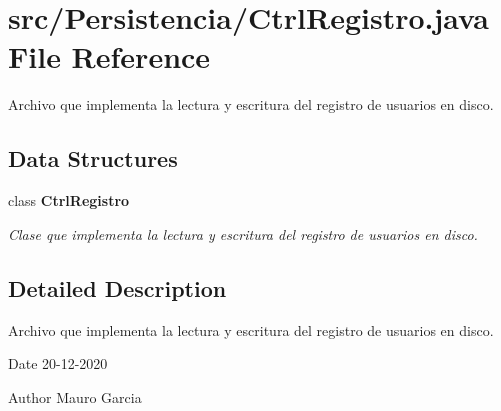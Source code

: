 \section{src/\+Persistencia/\+Ctrl\+Registro.java File Reference}
\label{_ctrl_registro_8java}


Archivo que implementa la lectura y escritura del registro de usuarios en disco.  


\subsection*{Data Structures}
\begin{DoxyCompactItemize}
\item 
class \textbf{ Ctrl\+Registro}
\begin{DoxyCompactList}\small\item\em Clase que implementa la lectura y escritura del registro de usuarios en disco. \end{DoxyCompactList}\end{DoxyCompactItemize}


\subsection{Detailed Description}
Archivo que implementa la lectura y escritura del registro de usuarios en disco. 

\begin{DoxyDate}{Date}
20-\/12-\/2020 
\end{DoxyDate}
\begin{DoxyAuthor}{Author}
Mauro Garcia 
\end{DoxyAuthor}

